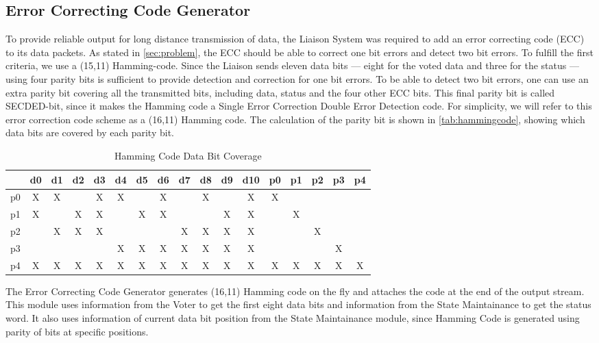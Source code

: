 \subsection{Error Correcting Code Generator}
To provide reliable output for long distance transmission of data, the
Liaison System was required to add an error correcting code (ECC) to
its data packets. As stated in \autoref{sec:problem}, the ECC should
be able to correct one bit errors and detect two bit errors. To
fulfill the first criteria, we use a (15,11)
Hamming-code\cite{ecc}. Since the Liaison sends eleven data bits ---
eight for the voted data and three for the status --- using four
parity bits is sufficient to provide detection and correction for one
bit errors. To be able to detect two bit errors, one can use an extra
parity bit covering all the transmitted bits, including data, status
and the four other ECC bits. This final parity bit is called
SECDED-bit, since it makes the Hamming code a Single Error Correction
Double Error Detection code\cite{ecc}. For simplicity, we will refer to
this error correction code scheme as a (16,11) Hamming code. The
calculation of the parity bit is shown in \autoref{tab:hammingcode},
showing which data bits are covered by each parity bit.

\begin{table}[htbp]
  \centering
  \caption{Hamming Code Data Bit Coverage}
  \begin{tabular}{|c|c|c|c|c|c|c|c|c|c|c|c|c|c|c|c|c|}
    \hline
   & d0 & d1 & d2 & d3 & d4 & d5 & d6 & d7 & d8 & d9 & d10 & p0 & p1 & p2 & p3 & p4 \\ \hline
p0 & X  & X  &    & X  & X  &    & X  &    & X  &    & X   & X  &    &    &    &    \\ \hline
p1 & X  &    & X  & X  &    & X  & X  &    &    & X  & X   &    & X  &    &    &    \\ \hline
p2 &    & X  & X  & X  &    &    &    & X  & X  & X  & X   &    &    & X  &    &    \\ \hline
p3 &    &    &    &    & X  & X  & X  & X  & X  & X  & X   &    &    &    & X  &    \\ \hline
p4 & X  & X  & X  & X  & X  & X  & X  & X  & X  & X  & X   & X  & X  & X  & X  & X  \\ \hline
    
  \end{tabular}
  \label{tab:hammingcode}
\end{table}


The Error Correcting Code Generator generates (16,11) Hamming code on
the fly and attaches the code at the end of the output stream. This
module uses information from the Voter to get the first eight data
bits and information from the State Maintainance to get the status
word. It also uses information of current data bit position from the
State Maintainance module, since Hamming Code is generated using
parity of bits at specific positions\cite{ecc}.

